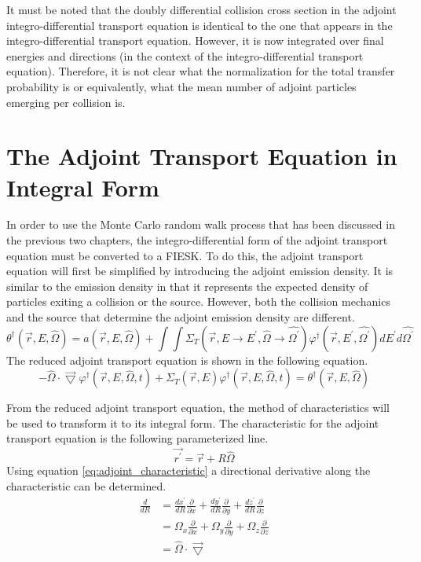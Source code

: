 It must be noted that the doubly differential collision cross section in the
adjoint integro-differential transport equation is identical to the one that
appears in the integro-differential transport equation. However, it is now
integrated over final energies and directions (in the context of the 
integro-differential transport equation). Therefore, it is not clear what the 
normalization for the total transfer probability is or equivalently, what the
mean number of adjoint particles emerging per collision is. 

\section{The Adjoint Transport Equation in Integral Form}
In order to use the Monte Carlo random walk process that has been discussed
in the previous two chapters, the integro-differential form of the adjoint
transport equation must be converted to a FIESK. To do this, the adjoint
transport equation will first be simplified by introducing the adjoint emission
density. It is similar to the emission density in that it represents the 
expected density of particles exiting a collision or the source. However, both
the collision mechanics and the source that determine the adjoint emission 
density are different.
\begin{equation}
  \theta^{\dagger}(\vec{r},E,\hat{\Omega}) = a(\vec{r},E,\hat{\Omega}) +
  \int\int \Sigma_T(\vec{r},E \to E^{'},\hat{\Omega} \to \hat{\Omega^{'}})
  \varphi^{\dagger}(\vec{r},E^{'},\hat{\Omega^{'}}) dE^{'}d\hat{\Omega^{'}}
  \label{eq:adjoint_emission_density}
\end{equation}
The reduced adjoint transport equation is shown in the following equation.
\begin{equation}
  -\hat{\Omega} \cdot \vec{\bigtriangledown} 
    \varphi^{\dagger}(\vec{r},E,\hat{\Omega},t)
    + \Sigma_T(\vec{r},E) \varphi^{\dagger}(\vec{r},E,\hat{\Omega},t) =
    \theta^{\dagger}(\vec{r},E,\hat{\Omega})
\end{equation}
  
From the reduced adjoint transport equation, the method of characteristics will
be used to transform it to its integral form. The characteristic for the 
adjoint transport equation is the following parameterized line.
\begin{equation}
  \vec{r^{'}} = \vec{r} + R\hat{\Omega}
  \label{eq:adjoint_characteristic}
\end{equation}
Using equation \ref{eq:adjoint_characteristic} a directional derivative along
the characteristic can be determined.
\begin{align}
  \frac{d}{dR} & = \frac{dx^{'}}{dR}\frac{\partial}{\partial x} +
  \frac{dy^{'}}{dR}\frac{\partial}{\partial y} +
  \frac{dz^{'}}{dR}\frac{\partial}{\partial z} \nonumber \\
  & = \Omega_x \frac{\partial}{\partial x} +
  \Omega_y \frac{\partial}{\partial y} +
  \Omega_z \frac{\partial}{\partial z} \nonumber \\
  & = \hat{\Omega} \cdot \vec{\bigtriangledown}
\end{align}

